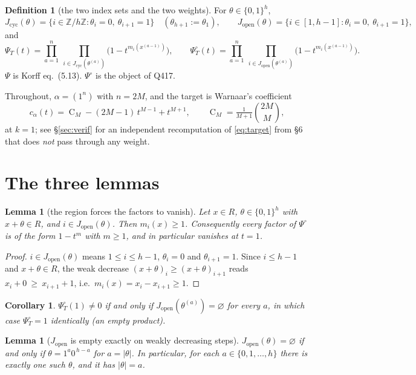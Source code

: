 \documentclass[11pt]{article}
\theoremstyle{plain}
\newtheorem{lemma}[theorem]{Lemma}
\newtheorem{corollary}[theorem]{Corollary}
\theoremstyle{definition}
\newtheorem{definition}[theorem]{Definition}
\newcommand{\Zh}{\mathbb{Z}/h\mathbb{Z}}
\newcommand{\Jop}{J_{\mathrm{open}}}
\newcommand{\Jcyc}{J_{\mathrm{cyc}}}
\newcommand{\Psiop}{\Psi^{\circ}}
\DeclareMathOperator{\Cat}{C}
\begin{document}
\begin{definition}[the two index sets and the two weights]
For $\theta\in\{0,1\}^h$,
\[
\Jcyc(\theta)=\{i\in\Zh:\theta_i=0,\ \theta_{i+1}=1\}
\quad(\theta_{h+1}:=\theta_1),
\qquad
\Jop(\theta)=\{i\in[1,h-1]:\theta_i=0,\ \theta_{i+1}=1\},
\]
and
\[
\Psi_T(t)=\prod_{a=1}^{n}\ \prod_{i\in\Jcyc(\theta^{(a)})}\!\!\bigl(1-t^{m_i(x^{(a-1)})}\bigr),
\qquad
\Psiop_T(t)=\prod_{a=1}^{n}\ \prod_{i\in\Jop(\theta^{(a)})}\!\!\bigl(1-t^{m_i(x^{(a-1)})}\bigr).
\]
$\Psi$ is Korff \cite{Korff} eq.~(5.13). $\Psiop$ is the object of Q417.
\end{definition}

Throughout, $\alpha=(1^n)$ with $n=2M$, and the target is Warnaar's coefficient
\begin{equation}\label{eq:target}
c_\alpha(t)=\Cat_M-(2M-1)\,t^{M-1}+t^{M+1},
\qquad \Cat_M=\tfrac{1}{M+1}\binom{2M}{M},
\end{equation}
at $k=1$; see \S\ref{sec:verif} for an independent recomputation of \eqref{eq:target} from
\cite{Warnaar} \S6 that does \emph{not} pass through any weight.

\section{The three lemmas}

\begin{lemma}[the region forces the factors to vanish]\label{lem:mge1}
Let $x\in R$, $\theta\in\{0,1\}^h$ with $x+\theta\in R$, and $i\in\Jop(\theta)$. Then
$m_i(x)\ge 1$. Consequently every factor of $\Psiop$ is of the form $1-t^{m}$ with $m\ge1$, and
in particular vanishes at $t=1$.
\end{lemma}

\begin{proof}
$i\in\Jop(\theta)$ means $1\le i\le h-1$, $\theta_i=0$ and $\theta_{i+1}=1$. Since $i\le h-1$ and
$x+\theta\in R$, the weak decrease $(x+\theta)_i\ge(x+\theta)_{i+1}$ reads
$x_i+0\ \ge\ x_{i+1}+1$, i.e.\ $m_i(x)=x_i-x_{i+1}\ge1$.
\end{proof}

\begin{corollary}\label{cor:allempty}
$\Psiop_T(1)\ne0$ if and only if $\Jop(\theta^{(a)})=\varnothing$ for every $a$, in which case
$\Psiop_T=1$ identically (an empty product).
\end{corollary}

\begin{lemma}[$\Jop$ is empty exactly on weakly decreasing steps]\label{lem:wd}
$\Jop(\theta)=\varnothing$ if and only if $\theta=1^{a}0^{\,h-a}$ for $a=|\theta|$. In
particular, for each $a\in\{0,1,\dots,h\}$ there is \emph{exactly one} such $\theta$, and it has
$|\theta|=a$.
\end{lemma}
\end{document}
